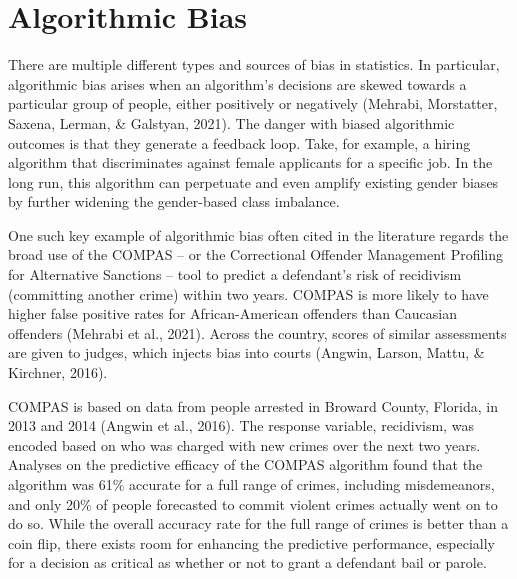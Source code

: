 \documentclass[12pt, twoside]{amherstthesis}
\begin{document}
\hypertarget{algbias}{%
\section{Algorithmic Bias}\label{algbias}}

There are multiple different types and sources of bias in statistics. In particular, algorithmic bias arises when an algorithm's decisions are skewed towards a particular group of people, either positively or negatively (Mehrabi, Morstatter, Saxena, Lerman, \& Galstyan, 2021). The danger with biased algorithmic outcomes is that they generate a feedback loop. Take, for example, a hiring algorithm that discriminates against female applicants for a specific job. In the long run, this algorithm can perpetuate and even amplify existing gender biases by further widening the gender-based class imbalance.

One such key example of algorithmic bias often cited in the literature regards the broad use of the COMPAS -- or the Correctional Offender Management Profiling for Alternative Sanctions -- tool to predict a defendant's risk of recidivism (committing another crime) within two years. COMPAS is more likely to have higher false positive rates for African-American offenders than Caucasian offenders (Mehrabi et al., 2021). Across the country, scores of similar assessments are given to judges, which injects bias into courts (Angwin, Larson, Mattu, \& Kirchner, 2016).

COMPAS is based on data from people arrested in Broward County, Florida, in 2013 and 2014 (Angwin et al., 2016). The response variable, recidivism, was encoded based on who was charged with new crimes over the next two years. Analyses on the predictive efficacy of the COMPAS algorithm found that the algorithm was 61\% accurate for a full range of crimes, including misdemeanors, and only 20\% of people forecasted to commit violent crimes actually went on to do so. While the overall accuracy rate for the full range of crimes is better than a coin flip, there exists room for enhancing the predictive performance, especially for a decision as critical as whether or not to grant a defendant bail or parole.
\end{document}
